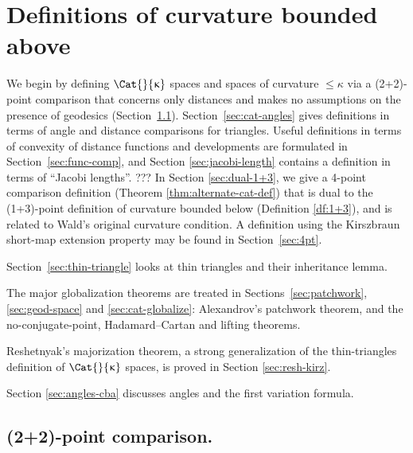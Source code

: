 
\chapter{Definitions of curvature bounded above}
We begin by defining $\Cat{}{\kappa}$ spaces and spaces of curvature $\le\kappa$ via a (2+2)-point comparison that concerns only distances and makes no assumptions on the presence of geodesics (Section~\ref{sec:cba-def}).  
Section~\ref{sec:cat-angles} gives definitions in terms of angle and distance comparisons for triangles.  
Useful definitions in terms of convexity of distance functions and developments are formulated in Section~\ref{sec:func-comp}, and Section \ref{sec:jacobi-length} contains a definition in terms of ``Jacobi lengths''. 
???
In Section \ref{sec:dual-1+3}, we give a 4-point comparison definition (Theorem \ref{thm:alternate-cat-def}) that is dual to the (1+3)-point definition of curvature bounded below (Definition \ref{df:1+3}), 
and is related to Wald's original curvature condition. 
A definition using the Kirszbraun short-map extension property may be found in Section~\ref{sec:4pt}.   %

Section~\ref{sec:thin-triangle} looks at thin triangles and their inheritance lemma. 

The major globalization theorems are treated in Sections~\ref{sec:patchwork}, \ref{sec:geod-space}
and \ref{sec:cat-globalize}: Alexandrov's patchwork theorem, and the no-conjugate-point, Hadamard--Cartan and lifting theorems. 

Reshetnyak's majorization theorem, a strong generalization of the thin-triangles definition of $\Cat{}{\kappa}$ spaces, is proved in Section \ref{sec:resh-kirz}.

Section \ref{sec:angles-cba} discusses angles and the first variation formula.   


\section{(2+2)-point comparison.} \label{sec:cba-def}


